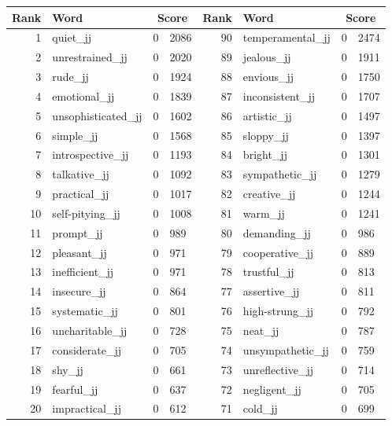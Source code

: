 \begin{table}[tbp]
    \begin{tabular}{| rlr@{.}l | rlr@{.}l |}
    \hline
    \textbf{Rank} & \textbf{Word} & \multicolumn{2}{c|}{\textbf{Score}} & \textbf{Rank} & \textbf{Word} & \multicolumn{2}{c|}{\textbf{Score}} \\
    \hline
    1 & quiet\_jj & 0 & 2086    &    90 & temperamental\_jj & 0 & 2474 \\
    2 & unrestrained\_jj & 0 & 2020    &    89 & jealous\_jj & 0 & 1911 \\
    3 & rude\_jj & 0 & 1924    &    88 & envious\_jj & 0 & 1750 \\
    4 & emotional\_jj & 0 & 1839    &    87 & inconsistent\_jj & 0 & 1707 \\
    5 & unsophisticated\_jj & 0 & 1602    &    86 & artistic\_jj & 0 & 1497 \\
    6 & simple\_jj & 0 & 1568    &    85 & sloppy\_jj & 0 & 1397 \\
    7 & introspective\_jj & 0 & 1193    &    84 & bright\_jj & 0 & 1301 \\
    8 & talkative\_jj & 0 & 1092    &    83 & sympathetic\_jj & 0 & 1279 \\
    9 & practical\_jj & 0 & 1017    &    82 & creative\_jj & 0 & 1244 \\
    10 & self-pitying\_jj & 0 & 1008    &    81 & warm\_jj & 0 & 1241 \\
    11 & prompt\_jj & 0 & 989    &    80 & demanding\_jj & 0 & 986 \\
    12 & pleasant\_jj & 0 & 971    &    79 & cooperative\_jj & 0 & 889 \\
    13 & inefficient\_jj & 0 & 971    &    78 & trustful\_jj & 0 & 813 \\
    14 & insecure\_jj & 0 & 864    &    77 & assertive\_jj & 0 & 811 \\
    15 & systematic\_jj & 0 & 801    &    76 & high-strung\_jj & 0 & 792 \\
    16 & uncharitable\_jj & 0 & 728    &    75 & neat\_jj & 0 & 787 \\
    17 & considerate\_jj & 0 & 705    &    74 & unsympathetic\_jj & 0 & 759 \\
    18 & shy\_jj & 0 & 661    &    73 & unreflective\_jj & 0 & 714 \\
    19 & fearful\_jj & 0 & 637    &    72 & negligent\_jj & 0 & 705 \\
    20 & impractical\_jj & 0 & 612    &    71 & cold\_jj & 0 & 699 \\

\end{tabular}
\end{table}
